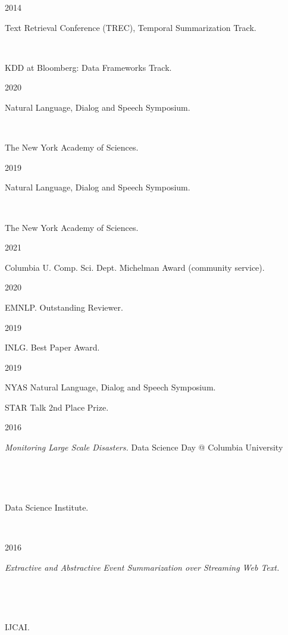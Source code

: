 \documentclass{scrartcl}
\newcommand{\MarginSection}[1]{\marginpar{#1}}
\begin{document}
\begin{cv}{}
\noindent \parbox{6em}{2014} Text Retrieval Conference (TREC), Temporal Summarization Track.

\noindent \parbox{6em}{~} KDD at Bloomberg: Data Frameworks Track.\\

\MarginSection{~\\Posters}

 \noindent \parbox{6em}{2020} Natural Language, Dialog and Speech  Symposium. \\\parbox{6em}{~} The New York Academy of Sciences. 

 \noindent \parbox{6em}{2019} Natural Language, Dialog and Speech  Symposium. \\\parbox{6em}{~} The New York Academy of Sciences. \\


\MarginSection{~\\Awards} 

\noindent \parbox{6em}{2021} Columbia U. Comp. Sci. Dept. Michelman Award (community service).

\noindent \parbox{6em}{2020} EMNLP. Outstanding Reviewer. 

\noindent \parbox{6em}{2019} INLG. Best Paper Award. 

\noindent \parbox{6em}{2019} NYAS Natural Language, Dialog and Speech  Symposium. \\
    \parbox{6em}{\phantom{2019}} STAR Talk 2nd Place Prize. \\   
  


\MarginSection{~\\Demos}


{\noindent\parbox{6em}{2016}  \textit{Monitoring Large Scale Disasters.} Data Science Day @ Columbia University} \\
 {\noindent\parbox{6em}{~~~~} \noindent  Data Science Institute.} \\

\MarginSection{~\\Doctoral\\Consortium}


{\noindent\parbox{6em}{2016}  \textit{Extractive and Abstractive Event Summarization over Streaming Web Text.}} \\
 {\noindent\parbox{6em}{~~~~} \noindent  IJCAI.}

~\\

\MarginSection{~\\Summer\\Schools}


\end{cv}
\end{document}
